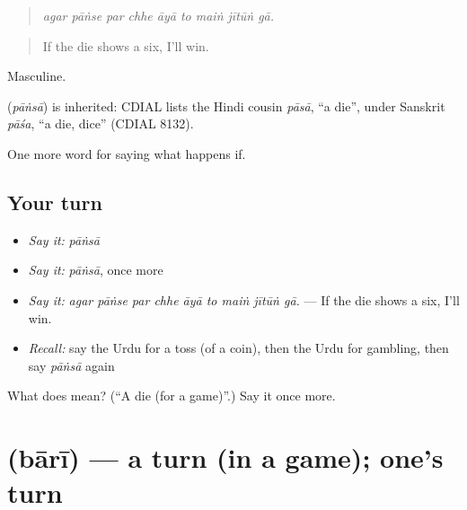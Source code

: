 \begin{quote}
        
\end{quote}

\begin{quote}
\emph{agar pāṅse par chhe āyā to maiṅ jītūṅ gā.}
\end{quote}

\begin{quote}
If the die shows a six, I'll win.
\end{quote}

Masculine.

\begin{cousinweb}
\textbf{} (\emph{pāṅsā}) is inherited: CDIAL lists the Hindi cousin \emph{pāsā}, \textquotedblleft{}a die\textquotedblright{}, under Sanskrit \emph{pāśa}, \textquotedblleft{}a die, dice\textquotedblright{} (CDIAL 8132).
\end{cousinweb}

\begin{grammarlens}[title={What you've built}]
One more word for saying what happens if.
\end{grammarlens}

\subsection*{Your turn}
\begin{itemize}
\raggedright
  \item \emph{Say it:} \emph{pāṅsā}
  \item \emph{Say it:} \emph{pāṅsā}, once more
  \item \emph{Say it:} \emph{agar pāṅse par chhe āyā to maiṅ jītūṅ gā.} — If the die shows a six, I'll win.
  \item \emph{Recall:} say the Urdu for a toss (of a coin), then the Urdu for gambling, then say \emph{pāṅsā} again
\end{itemize}

\begin{tcolorbox}[breakable,colback=teal!4,colframe=teal!35!black,title={Before you move on}]
What does  mean? (\textquotedblleft{}A die (for a game)\textquotedblright{}.) Say it once more.
\end{tcolorbox}
\section[\texorpdfstring{\ur{باری} (bārī)}{باری (bārī)}]{ (bārī) — a turn (in a game); one's turn}

